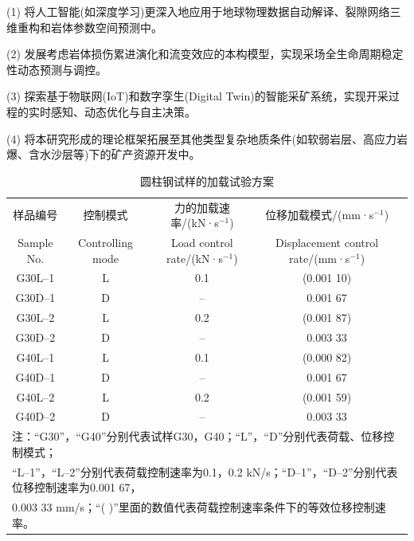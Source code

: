 \documentclass[twocolumn,a4paper,10pt]{article}
\begin{document}
(1) 将人工智能(如深度学习)更深入地应用于地球物理数据自动解译、裂隙网络三维重构和岩体参数空间预测中。

(2) 发展考虑岩体损伤累进演化和流变效应的本构模型，实现采场全生命周期稳定性动态预测与调控。

(3) 探索基于物联网(IoT)和数字孪生(Digital Twin)的智能采矿系统，实现开采过程的实时感知、动态优化与自主决策。

(4) 将本研究形成的理论框架拓展至其他类型复杂地质条件(如软弱岩层、高应力岩爆、含水沙层等)下的矿产资源开发中。

\begin{table}[htbp]
\centering
\small
\caption{圆柱钢试样的加载试验方案}
\label{tab:loading_test_scheme}
\begin{tabular}{@{}ccccc@{}}
\toprule
样品编号 & 控制模式 & 力的加载速率/(kN·s$^{-1}$) & 位移加载模式/(mm·s$^{-1}$) \\
Sample No. & Controlling mode & Load control rate/(kN·s$^{-1}$) & Displacement control rate/(mm·s$^{-1}$) \\
\midrule
G30L–1 & L & 0.1 & (0.001 10) \\
G30D–1 & D & – & 0.001 67 \\
G30L–2 & L & 0.2 & (0.001 87) \\
G30D–2 & D & – & 0.003 33 \\
G40L–1 & L & 0.1 & (0.000 82) \\
G40D–1 & D & – & 0.001 67 \\
G40L–2 & L & 0.2 & (0.001 59) \\
G40D–2 & D & – & 0.003 33 \\
\bottomrule
\multicolumn{5}{l}{\small 注：“G30”，“G40”分别代表试样G30，G40；“L”，“D”分别代表荷载、位移控制模式；} \\
\multicolumn{5}{l}{\small “L–1”，“L–2”分别代表荷载控制速率为0.1，0.2 kN/s；“D–1”，“D–2”分别代表位移控制速率为0.001 67，} \\
\multicolumn{5}{l}{\small 0.003 33 mm/s；“( )”里面的数值代表荷载控制速率条件下的等效位移控制速率。}
\end{tabular}
\end{table}
\end{document}
